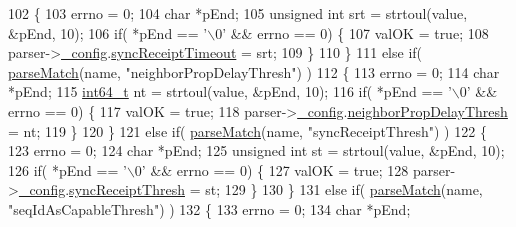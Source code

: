 \begin{DoxyCode}
102         \{
103             errno = 0;
104             \textcolor{keywordtype}{char} *pEnd;
105             \textcolor{keywordtype}{unsigned} \textcolor{keywordtype}{int} srt = strtoul(value, &pEnd, 10);
106             \textcolor{keywordflow}{if}( *pEnd == \textcolor{charliteral}{'\(\backslash\)0'} && errno == 0) \{
107                 valOK = \textcolor{keyword}{true};
108                 parser->\hyperlink{class_gptp_ini_parser_a8733e97ddaee116e34a67d3e222e45c9}{\_config}.\hyperlink{struct_gptp_ini_parser_1_1gptp__cfg__t_acdbb968dbfdc1d76285faa1973de3320}{syncReceiptTimeout} = srt;
109             \}
110         \}
111         \textcolor{keywordflow}{else} \textcolor{keywordflow}{if}( \hyperlink{class_gptp_ini_parser_a8465186d2562a5e0c599175104b214ad}{parseMatch}(name, \textcolor{stringliteral}{"neighborPropDelayThresh"}) )
112         \{
113             errno = 0;
114             \textcolor{keywordtype}{char} *pEnd;
115             \hyperlink{parse_8c_a67a9885ef4908cb72ce26d75b694386c}{int64\_t} nt = strtoul(value, &pEnd, 10);
116             \textcolor{keywordflow}{if}( *pEnd == \textcolor{charliteral}{'\(\backslash\)0'} && errno == 0) \{
117                 valOK = \textcolor{keyword}{true};
118                 parser->\hyperlink{class_gptp_ini_parser_a8733e97ddaee116e34a67d3e222e45c9}{\_config}.\hyperlink{struct_gptp_ini_parser_1_1gptp__cfg__t_a8e4aae7b1201b03be78ac2ada6cd5d03}{neighborPropDelayThresh} = nt;
119             \}
120         \}
121         \textcolor{keywordflow}{else} \textcolor{keywordflow}{if}( \hyperlink{class_gptp_ini_parser_a8465186d2562a5e0c599175104b214ad}{parseMatch}(name, \textcolor{stringliteral}{"syncReceiptThresh"}) )
122         \{
123             errno = 0;
124             \textcolor{keywordtype}{char} *pEnd;
125             \textcolor{keywordtype}{unsigned} \textcolor{keywordtype}{int} st = strtoul(value, &pEnd, 10);
126             \textcolor{keywordflow}{if}( *pEnd == \textcolor{charliteral}{'\(\backslash\)0'} && errno == 0) \{
127                 valOK = \textcolor{keyword}{true};
128                 parser->\hyperlink{class_gptp_ini_parser_a8733e97ddaee116e34a67d3e222e45c9}{\_config}.\hyperlink{struct_gptp_ini_parser_1_1gptp__cfg__t_a96a516505e2131562cadf9f96522afae}{syncReceiptThresh} = st;
129             \}
130         \}
131         \textcolor{keywordflow}{else} \textcolor{keywordflow}{if}( \hyperlink{class_gptp_ini_parser_a8465186d2562a5e0c599175104b214ad}{parseMatch}(name, \textcolor{stringliteral}{"seqIdAsCapableThresh"}) )
132         \{
133             errno = 0;
134             \textcolor{keywordtype}{char} *pEnd;

\end{DoxyCode}

